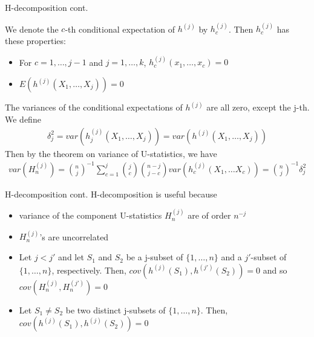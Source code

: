 \documentclass{beamer}
\theoremstyle{definition}
\numberwithin{Def}{section}
\begin{document}
\begin{frame}{H-decomposition cont. }
\begin{fontsize}{8}{12}
     We denote the $c$-th conditional expectation of $h^{(j)}$ by $h_c^{(j)}$. Then $h_c^{(j)}$ has these properties: 
    \begin{theorem}
    \begin{itemize}
        \item For $c = 1, \dotsc, j-1$ and $j = 1, \dotsc, k$, $h_c^{(j)}(x_1, \dotsc, x_c) = 0$
        \item $E(h^{(j)}(X_1, \dotsc, X_j)) = 0$
    \end{itemize}
    \end{theorem}
    
   The variances of the conditional expectations of $h^{(j)}$ are all zero, except the j-th. We define 
    \begin{align}
        \delta_j^2 = var(h_j^{(j)}(X_1, \dotsc, X_j)) = var(h^{(j)}(X_1, \dotsc, X_j))
    \end{align}
    Then by the theorem on variance of U-statistics, we have
    \begin{align}
        var(H_n^{(j)}) = {n \choose j}^{-1}\sum_{c=1}^j {j \choose c}{n-j \choose j-c}var(h_c^{(j)}(X_1, \dotsc X_c)) = {n \choose j}^{-1}\delta_j^2
         \end{align}
         \end{fontsize}
    \end{frame} 
    
    \begin{frame}{H-decomposition cont.}
        H-decomposition is useful because
        \begin{itemize}
            \item variance of the component U-statistics $H_n^{(j)}$ are of order $n^{-j}$
            \item $H_n^{(j)}$'s are uncorrelated
        \end{itemize}
        \begin{theorem}
    \begin{itemize}
        \item Let $j <j'$ and let $S_1$ and $S_2$ be a j-subset of $\{1, \dotsc, n\}$ and a $j'$-subset of $\{1, \dotsc, n\}$, respectively. Then, $cov(h^{(j)}(S_1), h^{(j')}(S_2)) = 0$ and so $cov(H_n^{(j)}, H_n^{(j')}) = 0$
        \item Let $S_1 \neq S_2$ be two distinct j-subsets of $\{1, \dotsc, n\}$. Then, $cov(h^{(j)}(S_1), h^{(j)}(S_2)) = 0$
    \end{itemize}
    \end{theorem}
    \end{frame}
    
\end{document}
